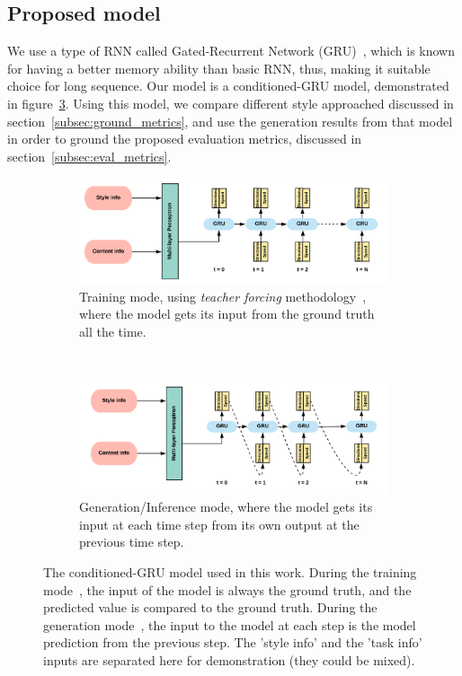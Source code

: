 \subsection{Proposed model}
We use a type of RNN called Gated-Recurrent Network (GRU)~\citep{chung2014empirical}, which is known for having a better memory ability than basic RNN, thus, making it suitable choice for long sequence. Our model is a conditioned-GRU model, demonstrated in figure~\ref{fig:dtl_model}. Using this model, we compare different style approached discussed in section~\ref{subsec:ground_metrics}, and use the generation results from that model in order to ground the proposed evaluation metrics, discussed in section~\ref{subsec:eval_metrics}.
\begin{figure}[!htbp]
    \centering
    \begin{subfigure}[b]{\textwidth}
        \includegraphics[width=\textwidth]{images/gbem/dtl_training.png}
        \caption{Training mode, using \textit{teacher forcing} methodology~\citep{Williams:1989:LAC:1351124.1351135,Goodfellow-et-al-2016}, where the model gets its input from the ground truth all the time.}
        \label{subfig:dtl_training}
    \end{subfigure}
    ~
    \begin{subfigure}[b]{\textwidth}
        \includegraphics[width=\textwidth]{images/gbem/dtl_generation.png}
        \caption{Generation/Inference mode, where the model gets its input at each time step from its own output at the previous time step.}
        \label{subfig:dtl_generation}
    \end{subfigure}

    \caption{The conditioned-GRU model used in this work. During the training mode~, the input of the model is always the ground truth, and the predicted value is compared to the ground truth. During the generation mode~, the input to the model at each step is the model prediction from the previous step. The 'style info' and the 'task info' inputs are separated here for demonstration (they could be mixed).}
    \label{fig:dtl_model}
\end{figure}

